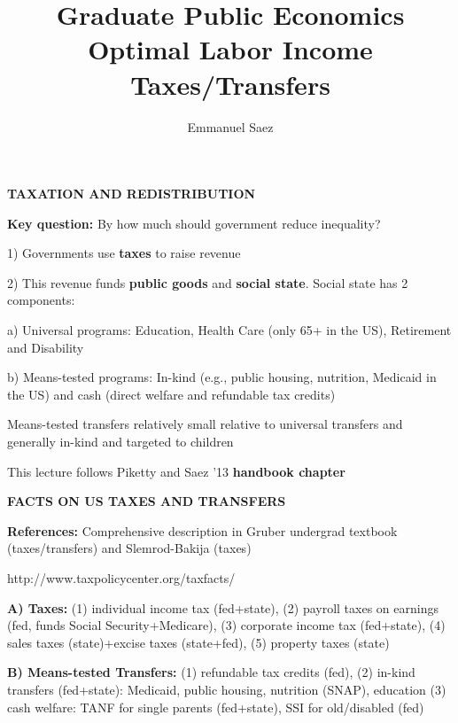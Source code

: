 \documentclass[landscape]{slides}
\author{Emmanuel Saez}
\date{}
\title{Graduate Public Economics \\
Optimal Labor Income Taxes/Transfers} \onlyslides{1-300}
\begin{document}
\begin{slide}
\maketitle
\end{slide}

\begin{slide}
\begin{center}
{\bf TAXATION AND REDISTRIBUTION}
\end{center}

{\bf Key question:} By how much should government reduce inequality?

1) Governments use {\bf taxes} to raise revenue

2) This revenue funds \textbf{public goods} and \textbf{social state}. Social state has 2 components:

\small

a) Universal programs: Education, Health Care
(only 65+ in the US), Retirement and Disability

b) Means-tested programs: In-kind (e.g., public housing, nutrition,
Medicaid in the US) and cash (direct welfare and refundable tax credits)
\normalsize

Means-tested transfers relatively small relative to universal transfers
and generally in-kind and targeted to children


This lecture follows Piketty and Saez '13 \textbf{handbook chapter}

\end{slide}

\begin{slide}

\end{slide}


\begin{slide}
\begin{center}
{\bf FACTS ON US TAXES AND TRANSFERS}
\end{center}
{\bf References:} Comprehensive description in Gruber undergrad
textbook (taxes/transfers) and Slemrod-Bakija (taxes)

http://www.taxpolicycenter.org/taxfacts/

{\bf A) Taxes:} (1) individual income tax (fed+state), (2) payroll
taxes on earnings (fed, funds Social Security+Medicare), (3)
corporate income tax (fed+state), (4) sales taxes (state)+excise
taxes (state+fed), (5) property taxes (state)

{\bf B) Means-tested Transfers:} (1) refundable tax credits (fed),
(2) in-kind transfers (fed+state): Medicaid, public housing, nutrition
(SNAP), education (3) cash welfare: TANF for single parents
(fed+state), SSI for old/disabled (fed)

\end{slide}
\end{document}
